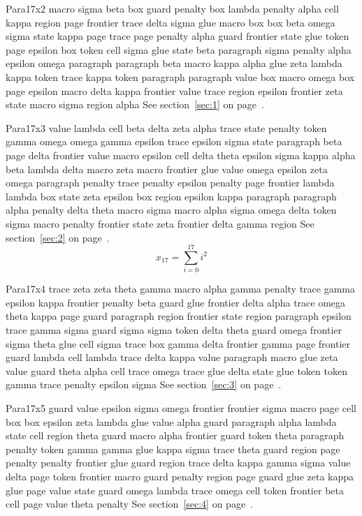 \documentclass{article}
\begin{document}
Para17x2 macro sigma beta box guard penalty box lambda penalty alpha cell kappa region page frontier trace delta sigma glue macro box box beta omega sigma state kappa page trace page penalty alpha guard frontier state glue token page epsilon box token cell sigma glue state beta paragraph sigma penalty alpha epsilon omega paragraph paragraph beta macro kappa alpha glue zeta lambda kappa token trace kappa token paragraph paragraph value box macro omega box page epsilon macro delta kappa frontier value trace region epsilon frontier zeta state macro sigma region alpha See section~\ref{sec:1} on page~\pageref{sec:13}.

Para17x3 value lambda cell beta delta zeta alpha trace state penalty token gamma omega omega gamma epsilon trace epsilon sigma state paragraph beta page delta frontier value macro epsilon cell delta theta epsilon sigma kappa alpha beta lambda delta macro zeta macro frontier glue value omega epsilon zeta omega paragraph penalty trace penalty epsilon penalty page frontier lambda lambda box state zeta epsilon box region epsilon kappa paragraph paragraph alpha penalty delta theta macro sigma macro alpha sigma omega delta token sigma macro penalty frontier state zeta frontier delta gamma region See section~\ref{sec:2} on page~\pageref{sec:14}.
\begin{equation} x_{17} = \sum_{i=0}^{17} i^2 \label{eq:17}\end{equation}

Para17x4 trace zeta zeta theta gamma macro alpha gamma penalty trace gamma epsilon kappa frontier penalty beta guard glue frontier delta alpha trace omega theta kappa page guard paragraph region frontier state region paragraph epsilon trace gamma sigma guard sigma sigma token delta theta guard omega frontier sigma theta glue cell sigma trace box gamma delta frontier gamma page frontier guard lambda cell lambda trace delta kappa value paragraph macro glue zeta value guard theta alpha cell trace omega trace glue delta state glue token token gamma trace penalty epsilon sigma See section~\ref{sec:3} on page~\pageref{sec:15}.

Para17x5 guard value epsilon sigma omega frontier frontier sigma macro page cell box box epsilon zeta lambda glue value alpha guard paragraph alpha lambda state cell region theta guard macro alpha frontier guard token theta paragraph penalty token gamma gamma glue kappa sigma trace theta guard region page penalty penalty frontier glue guard region trace delta kappa gamma sigma value delta page token frontier macro guard penalty region page guard glue zeta kappa glue page value state guard omega lambda trace omega cell token frontier beta cell page value theta penalty See section~\ref{sec:4} on page~\pageref{sec:16}.
\end{document}
